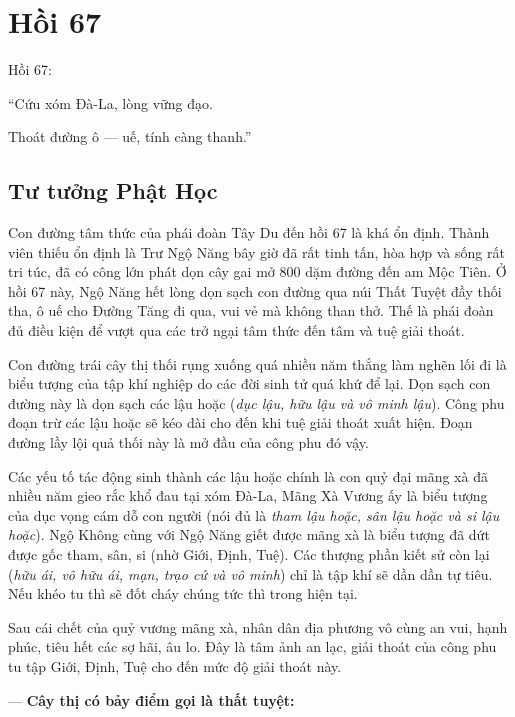 \chapter{Hồi 67} %
\label{cha:hoi_67}

Hồi 67:

\begin{itshape}
``Cứu xóm Đà-La, lòng vững đạo.

Thoát đường ô — uế, tính càng thanh.''
\end{itshape}

\section{Tư tưởng Phật Học} %
\label{sec:67_phat_hoc}

Con đường tâm thức của phái đoàn Tây Du đến hồi 67 là khá ổn định. Thành viên thiếu ổn định là Trư Ngộ Năng bây giờ đã rất tinh tấn, hòa hợp và sống rất tri túc, đã có công lớn phát dọn cây gai mở 800 dặm đường đến am Mộc Tiên. Ở hồi 67 này, Ngộ Năng hết lòng dọn sạch con đường qua núi Thất Tuyệt đầy thối tha, ô uế cho Đường Tăng đi qua, vui vẻ mà không than thở. Thế là phái đoàn đủ điều kiện để vượt qua các trở ngại tâm thức đến tâm và tuệ giải thoát.

Con đường trái cây thị thối rụng xuống quá nhiều năm thắng làm nghẽn lối đi là biểu tượng của tập khí nghiệp do các đời sinh tử quá khứ để lại. Dọn sạch con đường này là dọn sạch các lậu hoặc (\emph{dục lậu, hữu lậu và vô minh lậu}). Công phu đoạn trừ các lậu hoặc sẽ kéo dài cho đến khi tuệ giải thoát xuất hiện. Đoạn đường lầy lội quả thối này là mở đầu của công phu đó vậy.

Các yếu tố tác động sinh thành các lậu hoặc chính là con quỷ đại mãng xà đã nhiều năm gieo rắc khổ đau tại xóm Đà-La, Mãng Xà Vương ấy là biểu tượng của dục vọng cám dỗ con người (nói đủ là \emph{tham lậu hoặc, sân lậu hoặc và si lậu hoặc}). Ngộ Không cùng với Ngộ Năng giết được mãng xà là biểu tượng đã dứt được gốc tham, sân, si (nhờ Giới, Định, Tuệ). Các thượng phần kiết sử còn lại (\emph{hữu ái, vô hữu ái, mạn, trạo cử và vô minh}) chỉ là tập khí sẽ dần dần tự tiêu. Nếu khéo tu thì sẽ đốt cháy chúng tức thì trong hiện tại.

Sau cái chết của quỷ vương mãng xà, nhân dân địa phương vô cùng an vui, hạnh phúc, tiêu hết các sợ hãi, âu lo. Đây là tâm ảnh an lạc, giải thoát của công phu tu tập Giới, Định, Tuệ cho đến mức độ giải thoát này.

— {\bf Cây thị có bảy điểm gọi là thất tuyệt:}

